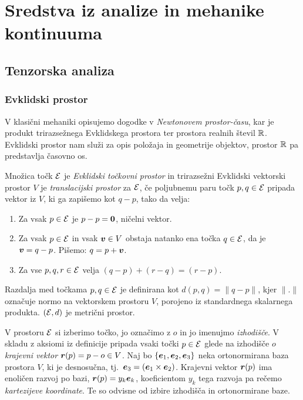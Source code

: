 \chapter{Sredstva iz analize in mehanike kontinuuma}


\section{Tenzorska analiza}


\subsection{Evklidski prostor}


V klasični mehaniki opisujemo dogodke v \emph{Newtonovem prostor-času}, kar je produkt
trirazsežnega Evklidskega prostora ter prostora realnih števil $\mathbb R$. Evklidski prostor nam služi
za opis položaja in geometrije objektov, prostor $\mathbb R$ pa predstavlja časovno os.

\begin{definicija} \label{d:ep}
	Množica točk $\mathcal E$ je \emph{Evklidski točkovni prostor} in trirazsežni Evklidski vektorski prostor $V$ je
	\emph{translacijski prostor} za $\mathcal E$, če poljubnemu paru točk $p,q\in\mathcal E$ pripada vektor iz $V$,
	ki ga zapišemo kot $q-p$, tako da velja:
	\begin{enumerate}
		\item Za vsak $p\in\mathcal E$ je $p-p=\boldsymbol 0$, ničelni vektor.
		\item Za vsak $p\in\mathcal E$ in vsak $\boldsymbol v\in V$ obstaja natanko ena točka $q\in\mathcal E$, da je
		$\boldsymbol v=q-p$. Pišemo: $q=p+\boldsymbol v$.
		\item Za vse $p,q,r\in\mathcal E$ velja $(q-p)+(r-q)=(r-p)$.
	\end{enumerate}
\end{definicija}

Razdalja med točkama $p,q\in\mathcal E$ je definirana kot $d(p,q)=\|q-p\|$, kjer $\|.\|$ označuje normo na
vektorskem prostoru $V$, porojeno iz standardnega skalarnega produkta. $(\mathcal E,d)$ je metrični prostor.

V prostoru $\mathcal E$ si izberimo točko, jo označimo z $o$ in jo imenujmo \emph{izhodišče}.
V skladu z aksiomi iz definicije pripada vsaki točki $p\in\mathcal E$ glede na izhodišče $o$ \emph{krajevni vektor}
$\boldsymbol r(p)=p-o\in V$. Naj bo $\{\boldsymbol e_1,\boldsymbol e_2,\boldsymbol e_3\}$ neka ortonormirana baza prostora $V$,
ki je desnosučna, tj.~$\boldsymbol e_3=(\boldsymbol e_1\times\boldsymbol e_2)$. Krajevni vektor $\boldsymbol r(p)$
ima enoličen razvoj po bazi, $\boldsymbol r(p)=y_k\boldsymbol e_k$, koeficientom $y_k$ tega razvoja pa rečemo
\emph{kartezijeve koordinate}. Te so odvisne od izbire izhodišča in ortonormirane baze.

